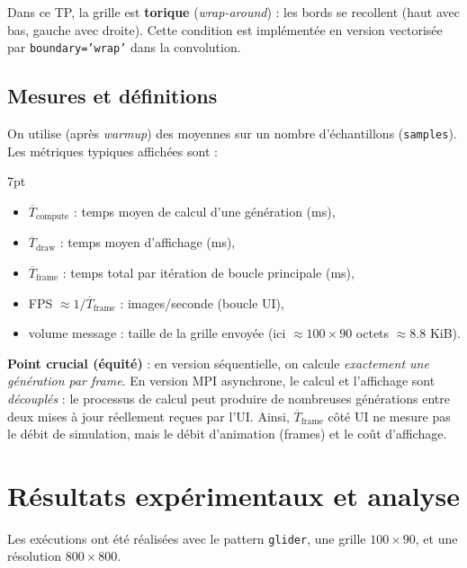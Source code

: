 \documentclass[11pt,a4paper]{article}
\newenvironment{formal}{%
\def\FrameCommand{%
  \hspace{1pt}%
  {\color{enstaBleuFonce}\vrule width 2pt}%
  {\color{formalshade}\vrule width 4pt}%
  \colorbox{formalshade}%
}%
\MakeFramed{\advance\hsize-\width\FrameRestore}%
\noindent\hspace{-4.55pt}%
\begin{adjustwidth}{}{7pt}%
\vspace{4pt}%
}{%
\vspace{4pt}\end{adjustwidth}\endMakeFramed%
}
\begin{document}
Dans ce TP, la grille est \textbf{torique} (\emph{wrap-around}) : les bords se recollent (haut avec bas, gauche avec droite). Cette condition est implémentée en version vectorisée par \texttt{boundary='wrap'} dans la convolution.

\subsection{Mesures et définitions}

On utilise (après \emph{warmup}) des moyennes sur un nombre d’échantillons (\texttt{samples}).
Les métriques typiques affichées sont :

\begin{formal}
\begin{itemize}[leftmargin=1.2em]
  \item $\overline{T}_{\text{compute}}$ : temps moyen de calcul d’une génération (ms),
  \item $\overline{T}_{\text{draw}}$ : temps moyen d’affichage (ms),
  \item $\overline{T}_{\text{frame}}$ : temps total par itération de boucle principale (ms),
  \item FPS $\approx 1/\overline{T}_{\text{frame}}$ : images/seconde (boucle UI),
  \item volume message : taille de la grille envoyée (ici $\approx 100 \times 90$ octets $\approx 8.8$ KiB).
\end{itemize}
\end{formal}

\textbf{Point crucial (équité)} : en version séquentielle, on calcule \emph{exactement une génération par frame}. En version MPI asynchrone, le calcul et l’affichage sont \emph{découplés} : le processus de calcul peut produire de nombreuses générations entre deux mises à jour réellement reçues par l’UI. Ainsi, $\overline{T}_{\text{frame}}$ côté UI ne mesure pas le débit de simulation, mais le débit d’animation (frames) et le coût d’affichage.

\section{Résultats expérimentaux et analyse}

Les exécutions ont été réalisées avec le pattern \texttt{glider}, une grille $100 \times 90$, et une résolution $800 \times 800$.
\end{document}
